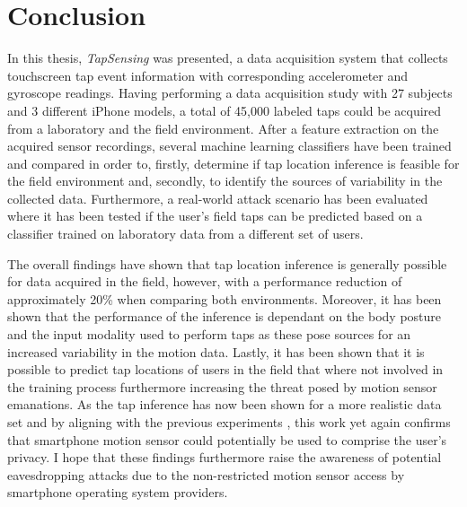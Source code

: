 \chapter{Conclusion\label{cha:chapter7}}
In this thesis, \textit{TapSensing} was presented, a data acquisition system that collects touchscreen tap event information with corresponding accelerometer and gyroscope readings. Having performing a data acquisition study with 27 subjects and 3 different iPhone models, a total of 45,000 labeled taps could be acquired from a laboratory and the field environment. After a feature extraction on the acquired sensor recordings, several machine learning classifiers have been trained and compared in order to, firstly, determine if tap location inference is feasible for the field environment and, secondly, to identify the sources of variability in the collected data. Furthermore, a real-world attack scenario has been evaluated where it has been tested if the user's field taps can be predicted based on a classifier trained on laboratory data from a different set of users.

The overall findings have shown that tap location inference is generally possible for data acquired in the field, however, with a performance reduction of approximately 20\% when comparing both environments. Moreover, it has been shown that the performance of the inference is dependant on the body posture and the input modality used to perform taps as these pose sources for an increased variability in the motion data. Lastly, it has been shown that it is possible to predict tap locations of users in the field that where not involved in the training process furthermore increasing the threat posed by motion sensor emanations. As the tap inference has now been shown for a more realistic data set and by aligning with the previous experiments \cite{Touchlogger, Tapprints, Accessory}, this work yet again confirms that smartphone motion sensor could potentially be used to comprise the user's privacy. I hope that these findings furthermore raise the awareness of potential eavesdropping attacks due to the non-restricted motion sensor access by smartphone operating system providers.



